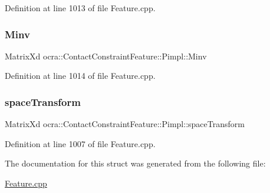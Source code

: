 Definition at line 1013 of file Feature.\+cpp.

\hypertarget{structocra_1_1ContactConstraintFeature_1_1Pimpl_afa7af0eb036037f47dfa1b93c02cd3d5}{}\label{structocra_1_1ContactConstraintFeature_1_1Pimpl_afa7af0eb036037f47dfa1b93c02cd3d5} 
\subsubsection{\texorpdfstring{Minv}{Minv}}
{\footnotesize\ttfamily Matrix\+Xd ocra\+::\+Contact\+Constraint\+Feature\+::\+Pimpl\+::\+Minv}



Definition at line 1014 of file Feature.\+cpp.

\hypertarget{structocra_1_1ContactConstraintFeature_1_1Pimpl_a3b33ee6094ed308df598785b4a75416c}{}\label{structocra_1_1ContactConstraintFeature_1_1Pimpl_a3b33ee6094ed308df598785b4a75416c} 
\subsubsection{\texorpdfstring{space\+Transform}{spaceTransform}}
{\footnotesize\ttfamily Matrix\+Xd ocra\+::\+Contact\+Constraint\+Feature\+::\+Pimpl\+::space\+Transform}



Definition at line 1007 of file Feature.\+cpp.



The documentation for this struct was generated from the following file\+:\begin{DoxyCompactItemize}
\item 
\hyperlink{Feature_8cpp}{Feature.\+cpp}\end{DoxyCompactItemize}
